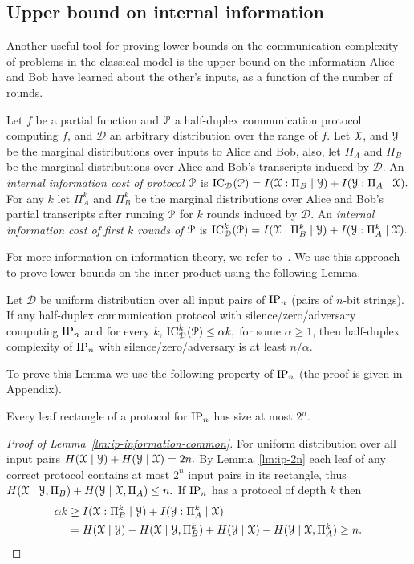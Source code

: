 \subsection{Upper bound on internal information}\label{subsec:information}
Another useful tool for proving lower bounds on the communication complexity of problems in the classical model is the upper bound on the information Alice and Bob have learned about the other's inputs, as a function of the number of rounds. 
\begin{definition}
    Let $f$ be a partial function and $\mathcal{P}$ a half-duplex communication protocol computing $f$, and $\mathcal{D}$ an arbitrary distribution over the range of $f$.
    Let $\mathcal{X}$, and $\mathcal{Y}$ be the marginal distributions over inputs to Alice and Bob,
    also, let $\Pi_A$ and $\Pi_B$ be the marginal distributions over Alice and Bob's transcripts 
    induced by $\mathcal{D}$.
    An \emph{internal information cost of protocol $\mathcal{P}$} is
    \(
    \mathrm{IC}_\mathcal{D}(\mathcal{P}) = I(\mathcal{X}:\Pi_B\mid\mathcal{Y}) + I(\mathcal{Y}:\Pi_A\mid\mathcal{X}).
    \)
    For any $k$ let $\Pi_A^k$ and $\Pi_B^k$ be the marginal distributions over Alice and Bob's partial transcripts after running $\mathcal{P}$ for $k$ rounds induced by $\mathcal{D}$.
    An \emph{internal information cost of first $k$ rounds of $\mathcal{P}$} is
    \(
    \mathrm{IC}_\mathcal{D}^k(\mathcal{P}) = I(\mathcal{X}:\Pi_B^k\mid\mathcal{Y}) + I(\mathcal{Y}:\Pi_A^k\mid\mathcal{X}).
    \)
\end{definition}

For more information on information theory, we refer to~\cite{CTJ2006,GMWW17}. We use this approach
to prove lower bounds on the inner product using the following Lemma.

\begin{lemma}\label{lm:ip-information-common}
    Let $\mathcal{D}$ be uniform distribution over all input pairs of $\mathrm{IP}_n$ (pairs of $n$-bit strings).
    If any half-duplex communication protocol with silence/zero/adversary computing $\mathrm{IP}_n$ and for every $k$,
    \(
    \mathrm{IC}_\mathcal{D}^k(\mathcal{P}) \le \alpha k,
    \)
    for some $\alpha\ge 1$, then half-duplex complexity of $\mathrm{IP}_n$ with silence/zero/adversary is at least $n/\alpha$. 
\end{lemma}
To prove this Lemma we use the following property of $\mathrm{IP}_n$ (the proof is given in Appendix).
\begin{lemma}\label{lm:ip-2n}
    Every leaf rectangle of a protocol for $\mathrm{IP}_n$ has size at most $2^n$. 
\end{lemma}
\begin{proof}[Proof of Lemma~\ref{lm:ip-information-common}]
For uniform distribution over all input pairs $H(\mathcal{X}\mid\mathcal{Y})+H(\mathcal{Y}\mid\mathcal{X})=2n.$
By Lemma~\ref{lm:ip-2n} each leaf of any correct protocol contains at most $2^n$ input pairs in its rectangle, thus $H(\mathcal{X}\mid\mathcal{Y},\Pi_B)+H(\mathcal{Y}\mid\mathcal{X},\Pi_A)\leq n.$ If $\mathrm{IP}_n$ has a protocol of depth $k$ then
\begin{align*}
\alpha k &\ge I(\mathcal{X}:\Pi_B^k\mid\mathcal{Y}) + I(\mathcal{Y}:\Pi_A^k\mid\mathcal{X}) \\
&= 
H(\mathcal{X}\mid\mathcal{Y}) - H(\mathcal{X}\mid\mathcal{Y},\Pi_B^k) + H(\mathcal{Y}\mid\mathcal{X}) - H(\mathcal{Y}\mid\mathcal{X},\Pi_A^k) \ge n.
\end{align*}
\end{proof}

